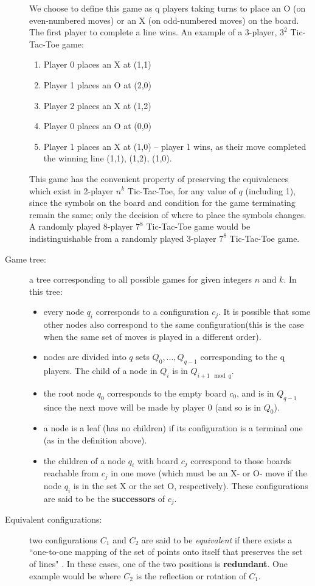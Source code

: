 \documentclass[english, 11pt]{article}
\begin{document}
\begin{description}
	We choose to define this game as q players taking turns to place an O (on even-numbered moves) or an X (on odd-numbered moves) on the board. The first player to complete a line wins. An example of a 3-player, $3^2$ Tic-Tac-Toe game:
	\begin{enumerate}
		\item Player 0 places an X at (1,1)
		\item Player 1 places an O at (2,0)
		\item Player 2 places an X at (1,2)
		\item Player 0 places an O at (0,0)
		\item Player 1 places an X at (1,0) – player 1 wins, as their move completed the winning line {(1,1), (1,2), (1,0)}. 
	\end{enumerate}
	This game has the convenient property of preserving the equivalences which exist in 2-player $n^k$ Tic-Tac-Toe, for any value of $q$ (including 1), since the symbols on the board and condition for the game terminating remain the same; only the decision of where to place the symbols changes. A randomly played 8-player $7^8$ Tic-Tac-Toe game would be indistinguishable from a randomly played 3-player $7^8$ Tic-Tac-Toe game.
	\item [Game tree:] a tree corresponding to all possible games for given integers $n$  and $k$. In this tree:
	\begin{itemize}
		\item every node $q_i$ corresponds to a configuration $c_j$. It is possible that some other nodes also correspond to the same configuration(this is the case when the same set of moves is played in a different order). 
		\item nodes are divided into $q$ sets $Q_0, ..., Q_{q-1}$ corresponding to the q players. The child of a node in $Q_i$ is in $Q_{i+1\mod q}$.
		\item the root node $q_0$ corresponds to the empty board $c_0$, and is in $Q_{q-1}$ since the next move will be made by player 0 (and so is in $Q_0$). 
		\item a node is a leaf (has no children) if its configuration is a terminal one (as in the definition above). 
		\item the children of a node $q_i$ with board $c_j$ correspond to those boards reachable from $c_j$ in one move (which must be an X- or O- move if the node $q_i$ is in the set X or the set O, respectively). These configurations are said to be the \textbf{successors} of $c_j$. 
	\end{itemize}  
	\item [Equivalent configurations: ] two configurations $C_1$ and $C_2$ are said to be \emph{equivalent} if there exists a ``one-to-one mapping of the set of points onto itself that preserves the set of lines" \cite{patash}. In these cases, one of the two positions is \textbf{redundant}. One example would be where $C_2$ is the reflection or rotation of $C_1$. 
\end{description}
\end{document}
